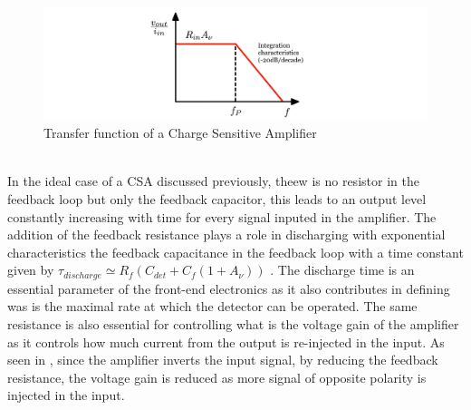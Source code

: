 		\begin{figure}[h]
		\centering
		\includegraphics[width=0.9\linewidth]{files/CSA_transfer_function}
		\caption{Transfer function of a Charge Sensitive Amplifier}
		\label{ }
		\end{figure}
		\\
		In the ideal case of a CSA discussed previously, theew is no resistor in the feedback loop but only the feedback capacitor, this leads to an output level constantly increasing with time for every signal inputed in the amplifier. The addition of the feedback resistance plays a role in discharging with exponential characteristics the feedback capacitance in the feedback loop with a time constant given by $\tau_{discharge} \simeq R_f {\left( C_{det} + C_f (1+A_\nu) \right)}$ . The discharge time is an essential parameter of the front-end electronics as it also contributes in defining was is the maximal rate at which the detector can be operated. The same resistance is also essential for controlling what is the voltage gain of the amplifier as it controls how much current from the output is re-injected in the input. As seen in , since the amplifier inverts the input signal, by reducing the feedback resistance, the voltage gain is reduced as more signal of opposite polarity is injected in the input.
		
		
